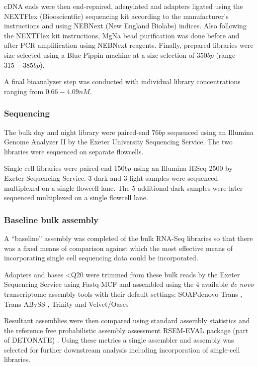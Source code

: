 cDNA ends were then end-repaired, adenylated and adapters ligated using the NEXTFlex (Biooscientfic) sequencing kit 
according to the manufacturer's instructions and using NEBNext (New England Biolabs) indices.  Also following
the NEXTFlex kit instructions, MgNa bead purification was done before and after PCR amplification using
NEBNext reagents.  Finally, prepared libraries were size selected using a Blue Pippin machine at a size selection
of \(350bp\) (range \(315-385bp\)).

A final bioanalyzer step was conducted with individual library concentrations ranging from \(0.66-4.09nM\).

\subsubsection{Sequencing}

The bulk day and night library were paired-end \(76bp\) sequenced using an Illumina Genome
Analyzer II by the Exeter University Sequencing Service.  The two libraries were sequenced
on separate flowcells.

Single cell libraries were paired-end \(150bp\) using an Illumina HiSeq 2500 by Exeter
Sequencing Service. 3 dark and 3 light samples were sequenced multiplexed on a single 
flowcell lane.  The 5 additional dark samples were later sequenced multiplexed on a single
flowcell lane.

\subsubsection{Baseline bulk assembly}

A ``baseline'' assembly was completed of the bulk RNA-Seq libraries so that there was a fixed
means of comparison against which the most effective means of incorporating single cell
sequencing data could be incorporated.

Adapters and bases <Q20 were trimmed from these bulk reads by the Exeter Sequencing Service
using Fastq-MCF \citep{Aronesty2013} and assembled using the 4 available \textit{de novo} 
transcriptome assembly tools with their default settings: SOAPdenovo-Trans \citep{Xie2014}, 
Trans-ABySS \citep{Robertson2010}, Trinity \citep{Haas2013} and Velvet/Oases \citep{Schulz2012a}

Resultant assemblies were then compared using standard assembly statistics and the reference
free probabilistic assembly assessment RSEM-EVAL package (part of DETONATE) \citep{Li2014}.
Using these metrics a single assembler and assembly was selected for further downstream
analysis including incorporation of single-cell libraries.


